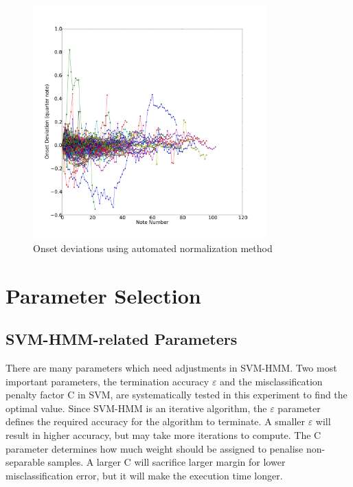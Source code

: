 
\begin{figure}[tp]
   \begin{center}
      \includegraphics[width=0.8\textwidth]{fig/lian_onset_1}
   \end{center}
   \caption{Onset deviations using automated normalization method}
   \label{fig:normauto}
\end{figure}


\section{Parameter Selection}
\label{sec:paramselect}
\subsection{SVM-HMM-related Parameters}
There are many parameters which need adjustments in SVM-HMM. Two most important parameters, the termination accuracy $\varepsilon$ and the misclassification penalty factor C in SVM, are systematically tested in this experiment to find the optimal value. Since SVM-HMM is an iterative algorithm, the $\varepsilon$ parameter defines the required accuracy for the algorithm to terminate. A smaller $\varepsilon$ will result in higher accuracy, but may take more iterations to compute. The C parameter determines how much weight should be assigned to penalise non-separable samples. A larger C will sacrifice larger margin for lower misclassification error, but it will make the execution time longer.%

